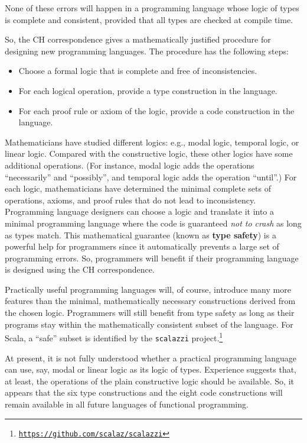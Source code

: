 None of these errors will happen in a programming language whose logic
of types is complete and consistent, \textemdash{} provided that all
types are checked at compile time. 

So, the CH correspondence gives a mathematically justified procedure
for designing new programming languages. The procedure has the following
steps:
\begin{itemize}
\item Choose a formal logic that is complete and free of inconsistencies.
\item For each logical operation, provide a type construction in the language.
\item For each proof rule or axiom of the logic, provide a code construction
in the language.
\end{itemize}
Mathematicians have studied different logics: e.g., modal logic, temporal
logic, or linear logic. Compared with the constructive logic, these
other logics have some additional operations. (For instance, modal
logic adds the operations \textsf{``}necessarily\textsf{''} and \textsf{``}possibly\textsf{''}, and
temporal logic adds the operation \textsf{``}until\textsf{''}.) For each logic, mathematicians
have determined the minimal complete sets of operations, axioms, and
proof rules that do not lead to inconsistency. Programming language
designers can choose a logic and translate it into a minimal programming
language where the code is guaranteed \emph{not to crash} as long
as types match. This mathematical guarantee (known as \textbf{type
safety}) is a powerful help for programmers since it automatically
prevents a large set of programming errors. So, programmers will benefit
if their programming language is designed using the CH correspondence.

Practically useful programming languages will, of course, introduce
many more features than the minimal, mathematically necessary constructions
derived from the chosen logic. Programmers will still benefit from
type safety as long as their programs stay within the mathematically
consistent subset of the language. For Scala, a \textsf{``}safe\textsf{''} subset
is identified by the \texttt{scalazzi} project.\footnote{\texttt{\href{https://github.com/scalaz/scalazzi}{https://github.com/scalaz/scalazzi}}}

At present, it is not fully understood whether a practical programming
language can use, say, modal or linear logic as its logic of types.
Experience suggests that, at least, the operations of the plain constructive
logic should be available. So, it appears that the six type constructions
and the eight code constructions will remain available in all future
languages of functional programming. 

